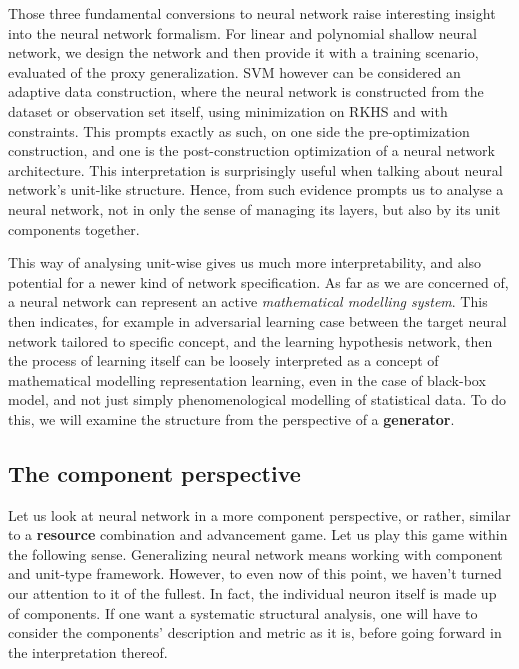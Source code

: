 \documentclass[10pt]{article} %
\begin{document}
Those three fundamental conversions to neural network raise interesting insight into the neural network formalism. For linear and polynomial shallow neural network, we design the network and then provide it with a training scenario, evaluated of the proxy generalization. SVM however can be considered an adaptive data construction, where the neural network is constructed from the dataset or observation set itself, using minimization on RKHS and with constraints. This prompts exactly as such, on one side the pre-optimization construction, and one is the post-construction optimization of a neural network architecture. This interpretation is surprisingly useful when talking about neural network's unit-like structure. Hence, from such evidence prompts us to analyse a neural network, not in only the sense of managing its layers, but also by its unit components together. 

This way of analysing unit-wise gives us much more interpretability, and also potential for a newer kind of network specification. As far as we are concerned of, a neural network can represent an active \textit{mathematical modelling system}. This then indicates, for example in adversarial learning case between the target neural network tailored to specific concept, and the learning hypothesis network, then the process of learning itself can be loosely interpreted as a concept of mathematical modelling representation learning, even in the case of black-box model, and not just simply phenomenological modelling of statistical data. To do this, we will examine the structure from the perspective of a \textbf{generator}.

\subsection{The component perspective}

Let us look at neural network in a more component perspective, or rather, similar to a \textbf{resource} combination and advancement game. Let us play this game within the following sense. Generalizing neural network means working with component and unit-type framework. However, to even now of this point, we haven't turned our attention to it of the fullest. In fact, the individual neuron itself is made up of components. If one want a systematic structural analysis, one will have to consider the components' description and metric as it is, before going forward in the interpretation thereof. 
\end{document}
